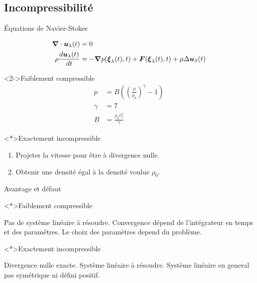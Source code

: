 \subsection{Incompressibilité}
\begin{frame}[<+->]{Équations de Navier-Stokes}
 
\begin{align*}
{\boldsymbol {\nabla}} \cdot {\boldsymbol {u}}_{\lambda}(t)&=0\\
\rho\frac{d {\boldsymbol {u}}_{\lambda}(t)}{d t}&=-{\boldsymbol {\nabla}} p({\boldsymbol {\xi}}_{\lambda}(t),t)+{\boldsymbol {F}}({\boldsymbol {\xi}}_{\lambda}(t),t)+\mu \Delta {\boldsymbol {u}}_{\lambda}(t)
\end{align*}

\begin{block}<2->{Faiblement compressible}
\begin{align*}
 p&=B\left(\left(\frac{\rho}{\rho_{0}}\right)^\gamma-1\right)\\
 \gamma&=7\\
 B&=\frac{\rho_0 c_s^2}{\gamma}
 \end{align*}
\end{block}

\begin{block}<*>{Exactement incompressible}
 \begin{enumerate}
  \item<3-> Projeter la vitesse pour être à divergence nulle.
  \item<4-> Obtenir une densité égal à la densité voulue $\rho_0$.
 \end{enumerate}
\end{block}

\end{frame}

\begin{frame}[<+->]{Avantage et défaut}
 \begin{block}<*>{Faiblement compressible}
  \begin{itemize}
   \plusitem Pas de système linéaire à résoudre.
   \moinsitem Convergence dépend de l'intégrateur en temps et des paramêtres.
   \moinsitem Le choix des paramètres depend du problème.
  \end{itemize}

 \end{block}
 
 \begin{block}<*>{Exactement incompressible}
 \begin{itemize}
  \plusitem Divergence nulle exacte.
  \moinsitem Système linéaire à résoudre.
  \moinsitem Système linéaire en general pas symétrique ni défini positif.
 \end{itemize}
  
 \end{block}

\end{frame}
